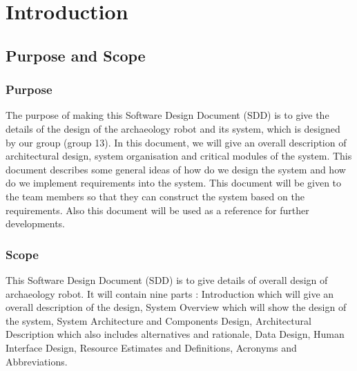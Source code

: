 \documentclass[11pt, a4paper]{report}
\begin{document}

\chapter{Introduction}%
\label{cha:I}


\section{Purpose and Scope}
\subsection{Purpose}
The purpose of making this Software Design Document (SDD) is to give the details of the design of the archaeology robot and its system, which is designed by our group (group 13). In this document, we will give an overall description of architectural design, system organisation and critical modules of the system. This document describes some general ideas of how do we design the system and how do we implement requirements into the system. This document will be given to the team members so that they can construct the system based on the requirements. Also this document will be used as a reference for further developments.


\subsection{Scope}
This Software Design Document (SDD) is to give details  of overall design of archaeology robot. It will contain nine parts : Introduction which will give an overall description of the design, System Overview which will show the design of the system, System Architecture and Components Design, Architectural Description which also includes alternatives and rationale, Data Design, Human Interface Design, Resource Estimates and Definitions, Acronyms and Abbreviations.
\end{document}
